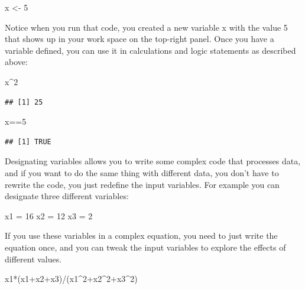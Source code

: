\documentclass[
]{book}
\newenvironment{Shaded}{\begin{snugshade}}{\end{snugshade}}
\newcommand{\DecValTok}[1]{\textcolor[rgb]{0.00,0.00,0.81}{#1}}
\newcommand{\NormalTok}[1]{#1}
\newcommand{\OtherTok}[1]{\textcolor[rgb]{0.56,0.35,0.01}{#1}}
\newcommand{\SpecialCharTok}[1]{\textcolor[rgb]{0.00,0.00,0.00}{#1}}
\begin{document}
\begin{Shaded}
\begin{Highlighting}[]
\NormalTok{x }\OtherTok{\textless{}{-}} \DecValTok{5}
\end{Highlighting}
\end{Shaded}

Notice when you run that code, you created a new variable x with the value 5 that shows up in your work space on the top-right panel. Once you have a variable defined, you can use it in calculations and logic statements as described above:

\begin{Shaded}
\begin{Highlighting}[]
\NormalTok{x}\SpecialCharTok{\^{}}\DecValTok{2}
\end{Highlighting}
\end{Shaded}

\begin{verbatim}
## [1] 25
\end{verbatim}

\begin{Shaded}
\begin{Highlighting}[]
\NormalTok{x}\SpecialCharTok{==}\DecValTok{5}
\end{Highlighting}
\end{Shaded}

\begin{verbatim}
## [1] TRUE
\end{verbatim}

Designating variables allows you to write some complex code that processes data, and if you want to do the same thing with different data, you don't have to rewrite the code, you just redefine the input variables. For example you can designate three different variables:

\begin{Shaded}
\begin{Highlighting}[]
\NormalTok{x1 }\OtherTok{=} \DecValTok{16}
\NormalTok{x2 }\OtherTok{=} \DecValTok{12}
\NormalTok{x3 }\OtherTok{=} \DecValTok{2}
\end{Highlighting}
\end{Shaded}

If you use these variables in a complex equation, you need to just write the equation once, and you can tweak the input variables to explore the effects of different values.

\begin{Shaded}
\begin{Highlighting}[]
\NormalTok{x1}\SpecialCharTok{*}\NormalTok{(x1}\SpecialCharTok{+}\NormalTok{x2}\SpecialCharTok{+}\NormalTok{x3)}\SpecialCharTok{/}\NormalTok{(x1}\SpecialCharTok{\^{}}\DecValTok{2}\SpecialCharTok{+}\NormalTok{x2}\SpecialCharTok{\^{}}\DecValTok{2}\SpecialCharTok{+}\NormalTok{x3}\SpecialCharTok{\^{}}\DecValTok{2}\NormalTok{)}
\end{Highlighting}
\end{Shaded}
\end{document}
